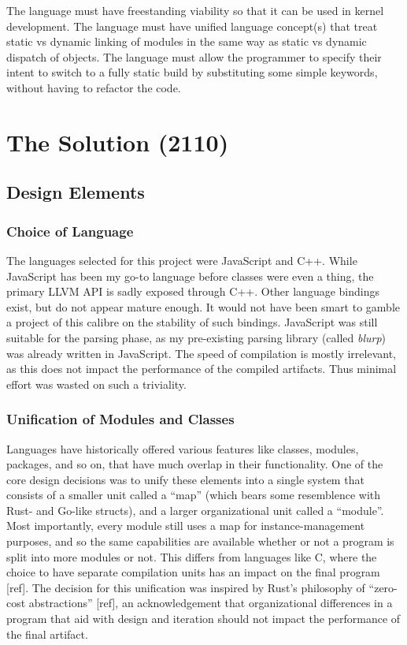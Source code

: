 \documentclass[12pt,a4paper,twoside]{report}
\begin{document}
The language must have freestanding viability so that it can be used in kernel development. The language must have unified language concept(s) that treat static vs dynamic linking of modules in the same way as static vs dynamic dispatch of objects. The language must allow the programmer to specify their intent to switch to a fully static build by substituting some simple keywords, without having to refactor the code.

\chapter{The Solution (2110)}

\section{Design Elements}

\subsection{Choice of Language}

The languages selected for this project were JavaScript and C++. While JavaScript has been my go-to language before classes were even a thing, the primary LLVM API is sadly exposed through C++. Other language bindings exist, but do not appear mature enough. It would not have been smart to gamble a project of this calibre on the stability of such bindings. JavaScript was still suitable for the parsing phase, as my pre-existing parsing library (called \textit{blurp}) was already written in JavaScript. The speed of compilation is mostly irrelevant, as this does not impact the performance of the compiled artifacts. Thus minimal effort was wasted on such a triviality.

\subsection{Unification of Modules and Classes}

Languages have historically offered various features like classes, modules, packages, and so on, that have much overlap in their functionality. One of the core design decisions was to unify these elements into a single system that consists of a smaller unit called a ``map'' (which bears some resemblence with Rust- and Go-like structs), and a larger organizational unit called a ``module''. Most importantly, every module still uses a map for instance-management purposes, and so the same capabilities are available whether or not a program is split into more modules or not. This differs from languages like C, where the choice to have separate compilation units has an impact on the final program [ref]. The decision for this unification was inspired by Rust's philosophy of ``zero-cost abstractions'' [ref], an acknowledgement that organizational differences in a program that aid with design and iteration should not impact the performance of the final artifact.
\end{document}
